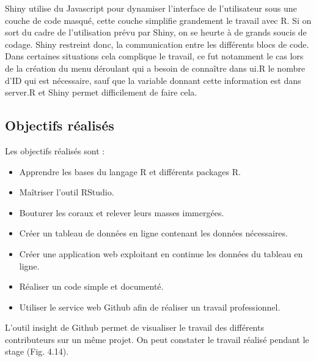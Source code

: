 \documentclass[]{article}
\begin{document}
Shiny utilise du Javascript pour dynamiser l'interface de l'utilisateur
sous une couche de code masqué, cette couche simplifie grandement le
travail avec R. Si on sort du cadre de l'utilisation prévu par Shiny, on
se heurte à de grands soucis de codage. Shiny restreint donc, la
communication entre les différents blocs de code. Dans certaines
situations cela complique le travail, ce fut notamment le cas lors de la
création du menu déroulant qui a besoin de connaître dans ui.R le nombre
d'ID qui est nécessaire, sauf que la variable donnant cette information
est dans server.R et Shiny permet difficilement de faire cela.

\subsection{Objectifs réalisés}\label{objectifs-realises}

Les objectifs réalisés sont :

\begin{itemize}
\item
  Apprendre les bases du langage R et différents packages R.
\item
  Maîtriser l'outil RStudio.
\item
  Bouturer les coraux et relever leurs masses immergées.
\item
  Créer un tableau de données en ligne contenant les données
  nécessaires.
\item
  Créer une application web exploitant en continue les données du
  tableau en ligne.
\item
  Réaliser un code simple et documenté.
\item
  Utiliser le service web Github afin de réaliser un travail
  professionnel.
\end{itemize}

L'outil insight de Github permet de visualiser le travail des différents
contributeurs sur un même projet. On peut constater le travail réalisé
pendant le stage (Fig. 4.14).
\end{document}
